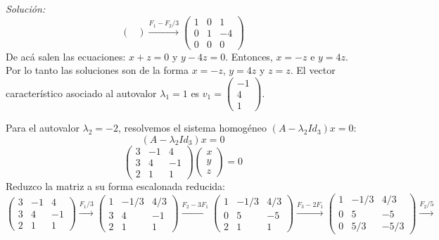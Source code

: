 \documentclass{article}
\newenvironment{solution}
    {\textit{Solución:}}
    {}
\begin{document}
\begin{solution}
$$\begin{pmatrix}
    \end{pmatrix} \xrightarrow{F_1-F_2/3}
    \begin{pmatrix}
        1 & 0 & 1 \\
        0 & 1 & -4 \\
        0 & 0 & 0
    \end{pmatrix}
    $$
    De acá salen las ecuaciones: $x+z = 0$ y $y-4z = 0$. Entonces, $x=-z$ e $y=4z$. Por lo tanto las soluciones son
    de la forma $x = -z$, $y = 4z$ y $z = z$. El vector característico asociado al autovalor $\lambda_1 = 1$ es $v_1 = \begin{pmatrix} -1 \\ 4 \\ 1 \end{pmatrix}$.
    
    Para el autovalor $\lambda_2 = -2$, resolvemos el sistema homogéneo $(A - \lambda_2 Id_3)x = 0$:
    $$
    (A - \lambda_2 Id_3)x = 0
    $$
    $$
    \begin{pmatrix}
    3 & -1 & 4 \\
    3 & 4 & -1 \\
    2 & 1 & 1
    \end{pmatrix}
    \begin{pmatrix}
    x \\
    y \\
    z
    \end{pmatrix}
    = 0
    $$
    Reduzco la matriz a su forma escalonada reducida:
    $$
    \begin{pmatrix}
        3 & -1 & 4 \\
        3 & 4 & -1 \\
        2 & 1 & 1
    \end{pmatrix} \xrightarrow{F_1/3}
    \begin{pmatrix}
        1 & -1/3 & 4/3 \\
        3 & 4 & -1 \\
        2 & 1 & 1
    \end{pmatrix} \xrightarrow{F_2-3F_1}
    \begin{pmatrix}
        1 & -1/3 & 4/3 \\
        0 & 5 & -5 \\
        2 & 1 & 1
    \end{pmatrix} \xrightarrow{F_3-2F_1}
    \begin{pmatrix}
        1 & -1/3 & 4/3 \\
        0 & 5 & -5 \\
        0 & 5/3 & -5/3
    \end{pmatrix} \xrightarrow{F_2/5}
$$
\end{solution}
\end{document}

